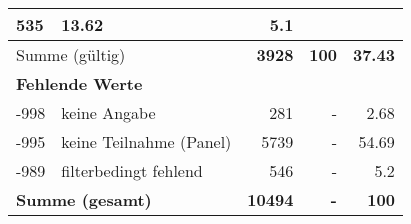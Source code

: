 \begin{longtable}{lXrrr}
       \num{535} &
       \num[round-mode=places,round-precision=2]{13,62} &
         \num[round-mode=places,round-precision=2]{5,1} \\
     \midrule
     \multicolumn{2}{l}{Summe (gültig)} &
       \textbf{\num{3928}} &
     \textbf{100} &
       \textbf{\num[round-mode=places,round-precision=2]{37,43}} \\
     \multicolumn{5}{l}{\textbf{Fehlende Werte}}\\
       -998 &
       keine Angabe &
         \num{281} &
        - &
         \num[round-mode=places,round-precision=2]{2,68} \\
       -995 &
       keine Teilnahme (Panel) &
         \num{5739} &
        - &
         \num[round-mode=places,round-precision=2]{54,69} \\
       -989 &
       filterbedingt fehlend &
         \num{546} &
        - &
         \num[round-mode=places,round-precision=2]{5,2} \\
     \midrule
     \multicolumn{2}{l}{\textbf{Summe (gesamt)}} &
          \textbf{\num{10494}} &
        \textbf{-} &
        \textbf{100} \\
     \bottomrule
     \end{longtable}
     
